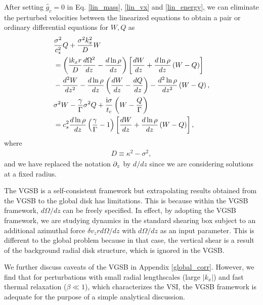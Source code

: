 After setting $\hat{g}_c=0$ in Eq. \ref{lin_mass}, \ref{lin_vx} and
\ref{lin_energy}, we can eliminate the perturbed velocities between
the linearized equations to obtain a pair or ordinary differential
equations for $W,Q$ as
\begin{align}
  &\frac{\sigma^2}{c_s^2}Q + \frac{\sigma^2k_x^2}{D}W \notag\\ 
  &=\left(\frac{\mathrm{i}
      k_x r}{D}\frac{d\Omega^2}{dz} -
    \frac{d\ln{\rho}}{dz}\right)\left[\frac{dW}{dz} +
    \frac{d\ln{\rho}}{dz}\left(W-Q\right)\right] \notag\\
  &- \frac{d^2W}{dz^2} - \frac{d\ln{\rho}}{dz}\left(\frac{dW}{dz} -
    \frac{dQ}{dz}\right) - \frac{d^2\ln{\rho}}{dz^2}\left(W-Q\right),\label{ode_w}\\
  &\sigma^2W - \frac{\gamma}{\Gamma}\sigma^2 Q +
  \frac{\mathrm{i}\sigma}{t_c}\left(W-\frac{Q}{\Gamma}\right)\notag\\
  &=c_s^2\frac{d\ln{\rho}}{dz}\left(\frac{\gamma}{\Gamma} - 1\right) 
  \left[\frac{dW}{dz} + \frac{d\ln{\rho}}{dz}\left(W-Q\right)\right],\label{ode_Q} 
\end{align}
where
\begin{align}
  D \equiv \kappa^2 - \sigma^2,
\end{align}
and we have replaced the notation $\partial_z$ by $d/dz$ since we are
considering solutions at a fixed radius. 

The VGSB is a self-consistent framework but extrapolating results 
obtained from the VGSB to the global disk has limitations. This is
because within the VGSB framework, $d\Omega/dz$ can be freely
specified. In effect, by adopting the VGSB framework, we are studying
dynamics in the standard shearing box subject to an additional
azimuthal force $\delta v_zr d \Omega/dz$ with $d\Omega/dz$ as an
input parameter. This is different to the global problem because in
that case, the vertical shear is a result of the background radial
disk structure, which is ignored in the VGSB.    

We further discuss caveats of the VGSB in Appendix \ref{global_corr}.
However, we find that for perturbations with small radial lengthscales
(large $|k_x|$) and fast thermal relaxation ($\beta\ll1$), which
characterizes the VSI, the VGSB framework is adequate for the purpose
of a simple analytical discussion. 





